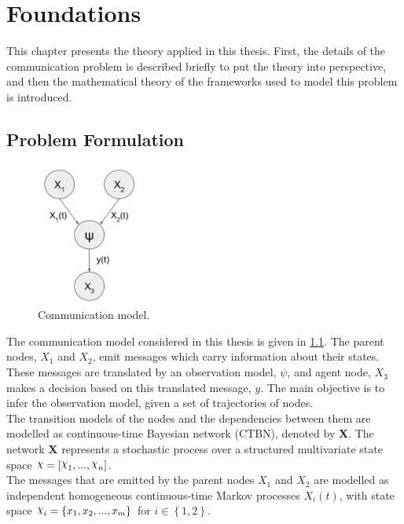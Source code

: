 \chapter{Foundations}
\label{chap:2}

This chapter presents the theory applied in this thesis. First, the details of the communication problem is described briefly to put the theory into perspective, and then the mathematical theory of the frameworks used to model this problem is introduced. 

\section{Problem Formulation}
\label{sec:prob_formulation}

\begin{figure}
	\begin{center}
		\includegraphics[width=3.5cm]{figures/simple_graph}
		\caption{Communication model.}
		\label{fig:graph_model}
	\end{center}
\end{figure} 
The communication model considered in this thesis is given in \cref{fig:graph_model}. The parent nodes, $X_{1}$ and $ X_{2}$, emit messages which carry information about their states. These messages are translated by an observation model, $\psi$, and agent node, $ X_{3} $ makes a decision based on this translated message, $ y $. The main objective is to infer the observation model, given a set of trajectories of nodes.\\
The transition models of the nodes and the dependencies between them are modelled as continuous-time Bayesian network (CTBN), denoted by \textbf{X}. The network \textbf{X} represents a stochastic process over a structured multivariate state space $ \rchi = [\rchi_1,..., \rchi_n] $. \\
The messages that are emitted by the parent nodes $X_{1}$ and $ X_{2} $ are modelled as independent homogeneous continuous-time Markov processes $X_{i}(t)$, with state space $ \rchi_{i} = \left\lbrace x_{1}, x_{2}, ..., x_{m} \right\rbrace  $ for $ i \in \left\lbrace 1,2 \right\rbrace $.\\
